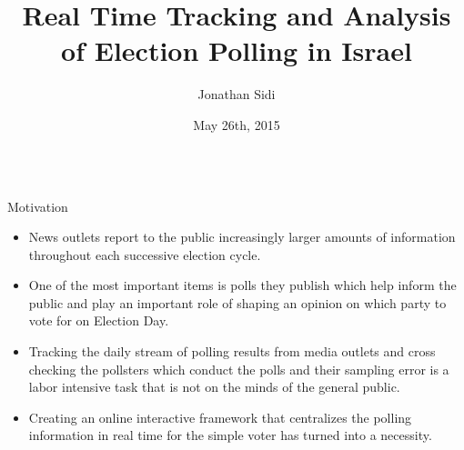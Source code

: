 \documentclass[final, hyperref={pdfpagelabels=false}]{beamer}
\title{Real Time Tracking and Analysis of Election Polling in Israel}
\author[Sidi]{Jonathan Sidi}
\institute[Hebrew University, Statistics Department]{ISA Conference 2015}
\date{May 26th, 2015}
\begin{document}
\begin{frame}{}
	\begin{columns}[t]
		\begin{column}{.3\linewidth}
			\begin{block}{Motivation}
				\begin{itemize}
					\item News outlets report to the public increasingly larger amounts of information throughout each successive election cycle. 
					\item One of the most important items is polls they publish which help inform the public and play an important role of shaping an opinion on which party to vote for on Election Day. 
					\item Tracking the daily stream of polling results from media outlets and cross checking the pollsters which conduct the polls and their sampling error is a labor intensive task that is not on the minds of the general public. 
					\item Creating an online interactive framework that centralizes the polling information in real time for the simple voter has turned into a necessity.
										

\end{itemize}
\end{block}
\end{column}
\end{columns}
\end{frame}
\end{document}
